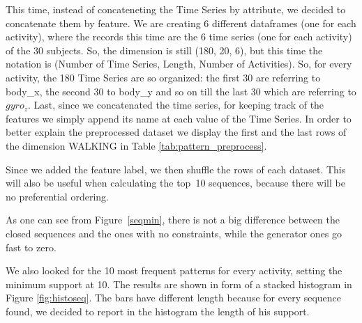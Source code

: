 \documentclass[10pt, a4paper, twocolumn]{article}
\begin{document}
This time, instead of concateneting the Time Series by attribute, we decided to concatenate them by feature. We are creating 6 different dataframes (one for each activity), where the records this time are the 6 time series (one for each activity) of the 30 subjects. So, the dimension is still (180, 20, 6), but this time the notation is (Number of Time Series, Length, Number of Activities). So, for every activity, the 180 Time Series are so organized: the first 30 are referring to body\_x, the second 30 to body\_y and so on till the last 30 which are referring to $gyro_z$. Last, since we concatenated the time series, for keeping track of the features we simply append its name at each value of the Time Series. In order to better explain the preprocessed dataset we display the first and the last rows of the dimension WALKING in Table \ref{tab:pattern_preprocess}.

Since we added the feature label, we then shuffle the rows of each dataset. This will also be useful when calculating the top~10 sequences, because there will be no preferential ordering.

As one can see from Figure~\ref{seqmin}, there is not a big difference between the closed sequences and the ones with no constraints, while the generator ones go fast to zero.

We also looked for the 10 most frequent patterns for every activity, setting the minimum support at 10. The results are shown in form of a stacked histogram in Figure \ref{fig:histoseq}. The bars have different length because for every sequence found, we decided to report in the histogram the length of his support. 
\end{document}
